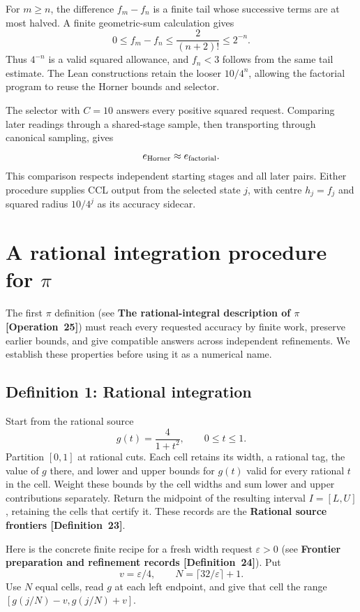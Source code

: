 \documentclass[11pt]{article}
\newcommand{\entryname}[3]{\textbf{#3 \mbox{[#1~#2]}}}
\begin{document}
For $m\geq n$, the difference $f_m-f_n$ is a finite tail whose successive
terms are at most halved. A finite geometric-sum calculation gives
\[
       0\leq f_m-f_n\leq\frac2{(n+2)!}\leq2^{-n}.
\]
Thus $4^{-n}$ is a valid squared allowance, and $f_n<3$ follows from the
same tail estimate. The Lean constructions retain the looser $10/4^n$,
allowing the factorial program to reuse the Horner bounds and selector.

The selector with $C=10$ answers every positive squared request. Comparing
later readings through a shared-stage sample, then transporting through
canonical sampling, gives
\[
                         e_{\rm Horner}\approx e_{\rm factorial}.
\]
This comparison respects independent starting stages and all later pairs.
Either procedure supplies CCL output from the selected state $j$, with
centre $h_j=f_j$ and squared radius $10/4^j$ as its accuracy sidecar.

\section{A rational integration procedure for \texorpdfstring{$\pi$}{pi}}\label{sec:integral}

The first $\pi$ definition
(see \entryname{Operation}{25}{The rational-integral description of $\pi$})
must reach every requested accuracy by finite
work, preserve earlier bounds, and give compatible answers across
independent refinements. We establish these properties before using it
as a numerical name.

\subsection*{Definition 1: Rational integration}

Start from the rational source
\[
                       g(t)=\frac4{1+t^2},\qquad0\leq t\leq1.
\]
Partition $[0,1]$ at rational cuts. Each cell retains its width, a rational
tag, the value of $g$ there, and lower and upper bounds for $g(t)$ valid
for every rational $t$ in the cell. Weight these bounds by the cell widths
and sum lower and upper contributions separately. Return the midpoint of
the resulting interval $I=[L,U]$, retaining the cells that certify it.
These records are the \entryname{Definition}{23}{Rational source frontiers}.

Here is the concrete finite recipe for a fresh width request
$\varepsilon>0$ (see \entryname{Definition}{24}{Frontier preparation and refinement records}).
Put
\[
       v=\varepsilon/4,\qquad
       N=\lceil32/\varepsilon\rceil+1.
\]
Use $N$ equal cells, read $g$ at each left endpoint, and give that cell
the range $[g(j/N)-v,g(j/N)+v]$.
\end{document}
